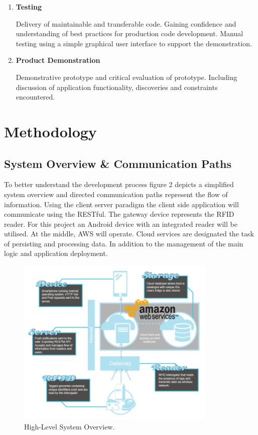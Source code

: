 \documentclass[a4paper, 11pt]{article}
\begin{document}
\begin{enumerate}
  \item \textbf{Testing}
   	\begin{flushleft}Delivery of maintainable and transferable code. Gaining confidence and understanding of best practices for production code development. Manual testing using a simple graphical user interface to support the demonstration.
 	\end{flushleft}
 
 \item \textbf{Product Demonstration}
 	\begin{flushleft}Demonstrative prototype and critical evaluation of prototype. Including discussion of application functionality, discoveries and constraints encountered.
 	\end{flushleft}
\end{enumerate}
\clearpage







\section{Methodology}

\subsection{System Overview \& Communication Paths}

To better understand the development process figure 2 depicts a simplified system overview and directed communication paths represent the flow of information. Using the client server paradigm the client side application will communicate using the RESTful. The gateway device represents the RFID reader. For this project an Android device with an integrated reader will be utilised. At the middle, AWS will operate. Cloud services are designated the task of persisting and processing data. In addition to the management of the main logic and application deployment. 

\begin{figure}[h!]
  \centering
    \includegraphics[width=0.85\textwidth]{system6.png}
      \caption{High-Level System Overview.}
\end{figure}
\end{document}
